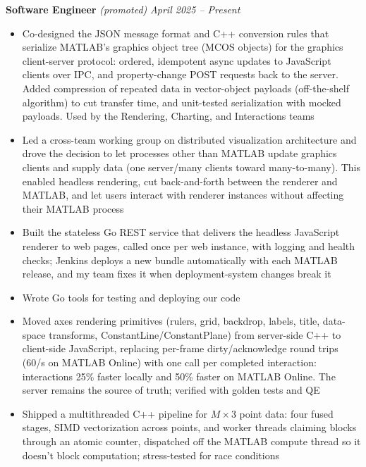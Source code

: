 \documentclass{article}
\begin{document}
{\large \textbf{Software Engineer}} \textit{(promoted)} \hfill \textit{April 2025 -- Present}
\begin{itemize}[leftmargin=*]
    \item Co-designed the JSON message format and C++ conversion rules that serialize MATLAB's graphics object tree (MCOS objects) for the graphics client-server protocol: ordered, idempotent async updates to JavaScript clients over IPC, and property-change POST requests back to the server. Added compression of repeated data in vector-object payloads (off-the-shelf algorithm) to cut transfer time, and unit-tested serialization with mocked payloads. Used by the Rendering, Charting, and Interactions teams %
    \item Led a cross-team working group on distributed visualization architecture and drove the decision to let processes other than MATLAB update graphics clients and supply data (one server\slash many clients toward many-to-many). This enabled headless rendering, cut back-and-forth between the renderer and MATLAB, and let users interact with renderer instances without affecting their MATLAB process %
    \item Built the stateless Go REST service that delivers the headless JavaScript renderer to web pages, called once per web instance, with logging and health checks; Jenkins deploys a new bundle automatically with each MATLAB release, and my team fixes it when deployment-system changes break it %
    \item Wrote Go tools for testing and deploying our code %
    \item Moved axes rendering primitives (rulers, grid, backdrop, labels, title, data-space transforms, ConstantLine/ConstantPlane) from server-side C++ to client-side JavaScript, replacing per-frame dirty/acknowledge round trips (60/s on MATLAB Online) with one call per completed interaction: interactions 25\% faster locally and 50\% faster on MATLAB Online. The server remains the source of truth; verified with golden tests and QE %
    \item Shipped a multithreaded C++ pipeline for $M \times 3$ point data: four fused stages, SIMD vectorization across points, and worker threads claiming blocks through an atomic counter, dispatched off the MATLAB compute thread so it doesn't block computation; stress-tested for race conditions %

\end{itemize}
\end{document}
